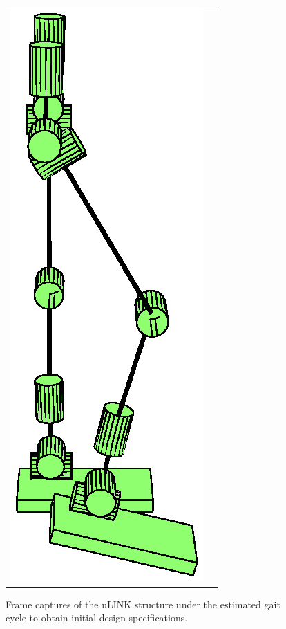 \begin{figure}[!h]
\begin{center}
\begin{tabular}{cc}
    \includegraphics[scale=0.5]{fig/design/ulinkwalk.eps}
	\end{tabular}
	\end{center}
  \caption{Frame captures of the uLINK structure under the estimated gait cycle to obtain initial design specifications.}
  \label{fig:ulinkframes}
\end{figure}

